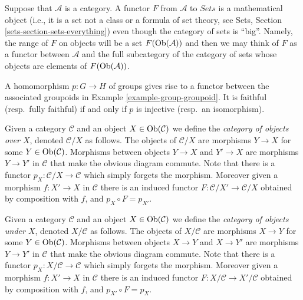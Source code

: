 \begin{remark}
\label{remark-functor-into-sets}
Suppose that $\mathcal{A}$ is a category.
A functor $F$ from $\mathcal{A}$ to $\textit{Sets}$
is a mathematical object (i.e., it is a set not a class or a formula
of set theory, see
Sets, Section \ref{sets-section-sets-everything})
even though the category of sets is ``big''.
Namely, the range of $F$ on objects will be
a set $F(\mathop{\mathrm{Ob}}\nolimits(\mathcal{A}))$ and then we
may think of $F$ as a functor between
$\mathcal{A}$ and the full subcategory
of the category of sets whose
objects are elements of $F(\mathop{\mathrm{Ob}}\nolimits(\mathcal{A}))$.
\end{remark}

\begin{example}
\label{example-group-homomorphism-functor}
A homomorphism $p : G\to H$ of groups gives rise to a functor
between the associated groupoids in Example \ref{example-group-groupoid}. It is
faithful (resp.\ fully faithful) if and only if $p$ is injective (resp.\ an
isomorphism).
\end{example}

\begin{example}
\label{example-category-over-X}
Given a category $\mathcal{C}$ and an object $X\in \mathop{\mathrm{Ob}}\nolimits(\mathcal{C})$
we define the {\it category of objects over $X$},
denoted $\mathcal{C}/X$ as follows.
The objects of $\mathcal{C}/X$ are morphisms $Y\to X$ for
some $Y\in \mathop{\mathrm{Ob}}\nolimits(\mathcal{C})$. Morphisms between objects
$Y\to X$ and $Y'\to X$ are morphisms $Y\to Y'$ in $\mathcal{C}$ that
make the obvious diagram commute. Note that there is a functor
$p_X : \mathcal{C}/X\to \mathcal{C}$ which simply forgets the
morphism. Moreover given a morphism $f : X'\to X$ in
$\mathcal{C}$ there is an induced functor
$F : \mathcal{C}/X' \to \mathcal{C}/X$ obtained by composition with $f$,
and $p_X\circ F = p_{X'}$.
\end{example}

\begin{example}
\label{example-category-under-X}
Given a category $\mathcal{C}$ and an object $X\in \mathop{\mathrm{Ob}}\nolimits(\mathcal{C})$
we define the {\it category of objects under $X$},
denoted $X/\mathcal{C}$ as follows.
The objects of $X/\mathcal{C}$ are morphisms $X\to Y$ for
some $Y\in \mathop{\mathrm{Ob}}\nolimits(\mathcal{C})$. Morphisms between objects
$X\to Y$ and $X\to Y'$ are morphisms $Y\to Y'$ in $\mathcal{C}$ that
make the obvious diagram commute. Note that there is a functor
$p_X : X/\mathcal{C}\to \mathcal{C}$ which simply forgets the
morphism. Moreover given a morphism $f : X'\to X$ in
$\mathcal{C}$ there is an induced functor
$F : X/\mathcal{C} \to X'/\mathcal{C}$
obtained by composition with $f$,
and $p_{X'}\circ F = p_X$.
\end{example}




